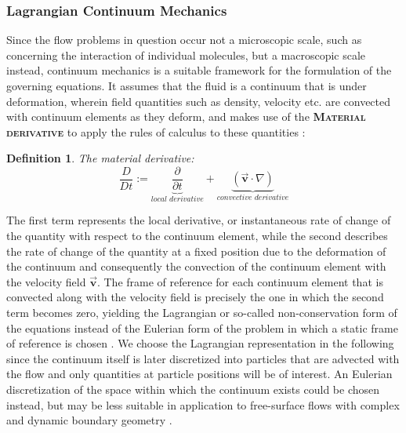 \documentclass[oneside, a4paper]{book}
\newtheorem{definition}{Definition}
\newcommand\emphasis[1]{{\scshape\bfseries#1}}
\newcommand\vek[1]{\vec{\bm{#1}}}
\newcommand\br[1]{\left(#1\right)}
\begin{document}
    \subsubsection{Lagrangian Continuum Mechanics}
    Since the flow problems in question occur not a microscopic scale, such as concerning the interaction of individual molecules, but a macroscopic scale instead, continuum mechanics is a suitable framework for the formulation of the governing equations. It assumes that the fluid is a continuum that is under deformation, wherein field quantities such as density, velocity etc. are convected with continuum elements as they deform, and makes use of the \emphasis{Material derivative} to apply the rules of calculus to these quantities \autocite{anderson}:
    \begin{definition} The material derivative:
      \[\frac{D}{Dt} := \underbrace{\frac{\partial}{\partial t}}_{\textit{local derivative}} + \underbrace{\br{\vek{v}\cdot \nabla}}_{\textit{convective derivative}}\]
    \end{definition}
    The first term represents the local derivative, or instantaneous rate of change of the quantity with respect to the continuum element, while the second describes the rate of change of the quantity at a fixed position due to the deformation of the continuum and consequently the convection of the continuum element with the velocity field $\vek{v}$. The frame of reference for each continuum element that is convected along with the velocity field is precisely the one in which the second term becomes zero, yielding the Lagrangian or so-called non-conservation form of the equations instead of the Eulerian form of the problem in which a static frame of reference is chosen \autocite{anderson}. We choose the Lagrangian representation in the following since the continuum itself is later discretized into particles that are advected with the flow and only quantities at particle positions will be of interest. An Eulerian discretization of the space within which the continuum exists could be chosen instead, but may be less suitable in application to free-surface flows with complex and dynamic boundary geometry \autocite{tutorial2019}.
\end{document}
